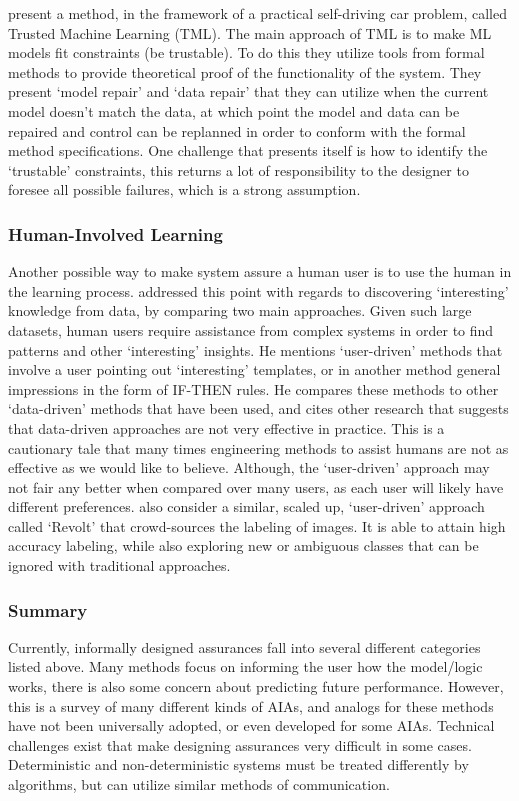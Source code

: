     \citet{Ghosh2016-dl} present a method, in the framework of a practical self-driving car problem, called Trusted Machine Learning (TML). The main approach of TML is to make ML models fit constraints (be trustable). To do this they utilize tools from formal methods to provide theoretical proof of the functionality of the system. They present `model repair' and `data repair' that they can utilize when the current model doesn't match the data, at which point the model and data can be repaired and control can be replanned in order to conform with the formal method specifications. One challenge that presents itself is how to identify the `trustable' constraints, this returns a lot of responsibility to the designer to foresee all possible failures, which is a strong assumption.

\subsubsection{Human-Involved Learning}
    Another possible way to make system assure a human user is to use the human in the learning process. \citet{Freitas2006-qo} addressed this point with regards to discovering `interesting' knowledge from data, by comparing two main approaches. Given such large datasets, human users require assistance from complex systems in order to find patterns and other `interesting' insights. He mentions `user-driven' methods that involve a user pointing out `interesting' templates, or in another method general impressions in the form of IF-THEN rules. He compares these methods to other `data-driven' methods that have been used, and cites other research that suggests that data-driven approaches are not very effective in practice. This is a cautionary tale that many times engineering methods to assist humans are not as effective as we would like to believe. Although, the `user-driven' approach may not fair any better when compared over many users, as each user will likely have different preferences. \citet{Chang2017-kl} also consider a similar, scaled up, `user-driven' approach called `Revolt' that crowd-sources the labeling of images. It is able to attain high accuracy labeling, while also exploring new or ambiguous classes that can be ignored with traditional approaches.

\subsubsection{Summary}
Currently, informally designed assurances fall into several different categories listed above. Many methods focus on informing the user how the model/logic works, there is also some concern about predicting future performance. However, this is a survey of many different kinds of AIAs, and analogs for these methods have not been universally adopted, or even developed for some AIAs. Technical challenges exist that make designing assurances very difficult in some cases. Deterministic and non-deterministic systems must be treated differently by algorithms, but can utilize similar methods of communication.

